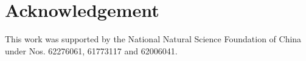 \section{Acknowledgement}

This work was supported by the National Natural Science Foundation of China under Nos. 62276061, 61773117 and 62006041.


























%
